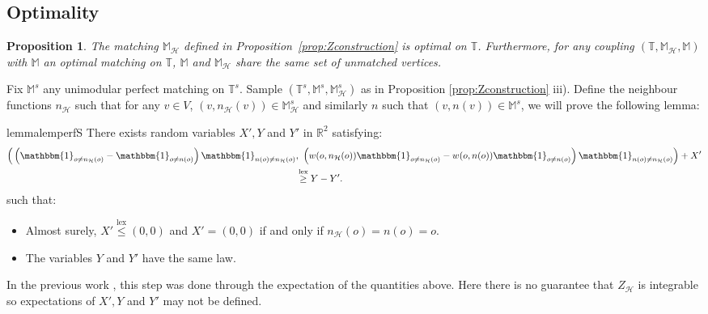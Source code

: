 \documentclass[11pt]{article}
\DeclareMathOperator{\lex}{lex}
\newtheorem{prop}{Proposition}[section]
\begin{document}
\subsection{Optimality}
\begin{prop}\label{prop:optimality}
    The matching  $\mathbb{M}_{\mathcal{H}}$ defined in Proposition~\ref{prop:Zconstruction} is optimal on $\mathbb{T}$. Furthermore, for any coupling $(\mathbb{T},\mathbb{M}_{\mathcal{H}},\mathbb{M})$ with $\mathbb{M}$ an optimal matching on $\mathbb{T}$, $\mathbb{M}$ and $\mathbb{M}_{\mathcal{H}}$ share the same set of unmatched vertices.
\end{prop}
Fix $\mathbb{M}^{s}$ any unimodular perfect matching on $\mathbb{T}^s$. Sample $(\mathbb{T}^s,\mathbb{M}^s,\mathbb{M}_{\mathcal{H}}^s)$ as in Proposition \ref{prop:Zconstruction} iii).
 Define the neighbour functions $n_{\mathcal{H}}$ such that for any $v \in V$, $(v,n_{\mathcal{H}}(v)) \in \mathbb{M}^s_{\mathcal{H}}$ and similarly $n$ such that $(v,n(v)) \in \mathbb{M}^s$, we will prove the following lemma:
\begin{restatable}{lemma}{lemperfS}\label{lem:perfS}
There exists random variables $X',Y$ and $Y'$ in $\mathbb{R}^2$ satisfying:
     \begin{align*}
          \Big( \left( \mathbbm{1}_{o \neq n_{\mathcal{H}}(o)} - \mathbbm{1}_{o \neq n(o)}  \right) \mathbbm{1}_{n(o) \neq n_{\mathcal{H}}(o)}  &,\ \left( w(o,n_{\mathcal{H}}(o))\mathbbm{1}_{o \neq n_{\mathcal{H}}(o)} - w(o,n(o))\mathbbm{1}_{o \neq n(o)} \right)\mathbbm{1}_{n(o) \neq n_{\mathcal{H}}(o)}   \Big) + X' \\
          &\overset{\lex}{\geq} Y-Y'.
     \end{align*}
     such that:
     \begin{itemize}
         \item Almost surely, $X' \overset{\lex}{\leq }(0,0)$ and $X'=(0,0)$ if and only if $n_{\mathcal{H}}(o)=n(o)=o$. 
         \item The variables $Y$ and $Y'$ have the same law.
     \end{itemize}
\end{restatable}
\begin{remark}
    In the previous work \cite{enriquez2024optimalunimodularmatching}, this step was done through the expectation of the quantities above. Here there is no guarantee that $Z_{\mathcal{H}}$ is integrable so expectations of $X',Y$ and $Y'$ may not be defined.
\end{remark}
\end{document}
